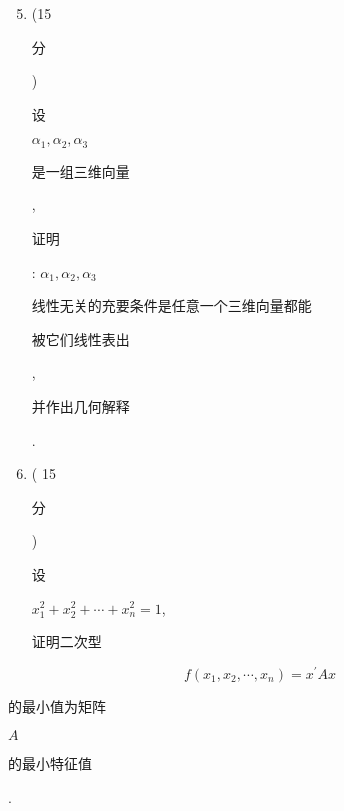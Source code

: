 \documentclass[10pt]{article}
\begin{document}
\begin{enumerate}
  \setcounter{enumi}{4}
  \item (15 \begin{CJK}{UTF8}{mj}分\end{CJK}) \begin{CJK}{UTF8}{mj}设\end{CJK} $\alpha_{1}, \alpha_{2}, \alpha_{3}$ \begin{CJK}{UTF8}{mj}是一组三维向量\end{CJK}, \begin{CJK}{UTF8}{mj}证明\end{CJK}: $\alpha_{1}, \alpha_{2}, \alpha_{3}$ \begin{CJK}{UTF8}{mj}线性无关的充要条件是任意一个三维向量都能\end{CJK} \begin{CJK}{UTF8}{mj}被它们线性表出\end{CJK}, \begin{CJK}{UTF8}{mj}并作出几何解释\end{CJK}.

  \item ( 15 \begin{CJK}{UTF8}{mj}分\end{CJK}) \begin{CJK}{UTF8}{mj}设\end{CJK} $x_{1}^{2}+x_{2}^{2}+\cdots+x_{n}^{2}=1$, \begin{CJK}{UTF8}{mj}证明二次型\end{CJK}

\end{enumerate}
$$
f\left(x_{1}, x_{2}, \cdots, x_{n}\right)=x^{\prime} A x
$$
\begin{CJK}{UTF8}{mj}的最小值为矩阵\end{CJK} $A$ \begin{CJK}{UTF8}{mj}的最小特征值\end{CJK}.
\end{document}
